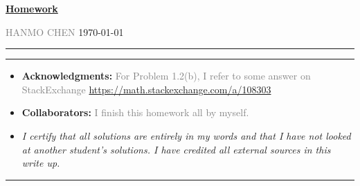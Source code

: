 \documentclass[a4paper]{article}
\begin{document}
\courseheader



\setcounter{hwcnt}{5} %

\begin{center}
  \underline{\bf Homework \thehwcnt} \\
\end{center}
\begin{flushleft}
  \textcolor{gray}{HANMO CHEN}\hfill
  \today
\end{flushleft}
\hrule

\vspace{2em}


\newcommand{\EX}{\mathbb{E}}
\newcommand{\x}{\mathsf{x}}
\newcommand{\y}{\mathsf{y}}

\flushleft
\rule{\textwidth}{1pt}
\begin{itemize}
\item {\bf Acknowledgments: \/} 
  \textcolor{gray}{For Problem 1.2(b), I refer to some answer on StackExchange \small{\url{https://math.stackexchange.com/a/108303}}}

\item {\bf Collaborators: \/}
  \textcolor{gray}{I finish this homework all by myself.} 
\item  \emph{I certify that all solutions are entirely in my words and that I have not looked at another student's solutions. I have credited all external sources in this write up.}


  \framebox[\linewidth]{\rule{0pt}{10pt}\textcolor{gray}{\large Hanmo Chen}}
\end{itemize}
\rule{\textwidth}{1pt}
\end{document}

